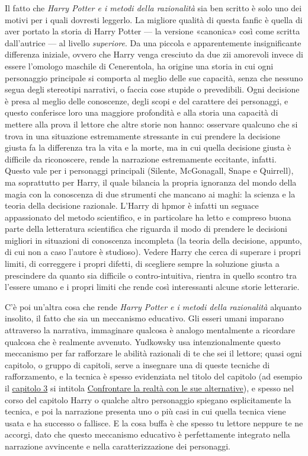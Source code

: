 Il fatto che \emph{Harry Potter e i metodi della razionalità} sia ben scritto è solo uno dei motivi per i quali dovresti leggerlo. La migliore qualità di questa fanfic è quella di aver portato la storia di Harry Potter — la versione «canonica» così come scritta dall’autrice — al livello \emph{superiore}. Da una piccola e apparentemente insignificante differenza iniziale, ovvero che Harry venga cresciuto da due zii amorevoli invece di essere l’omologo maschile di Cenerentola, ha origine una storia in cui ogni personaggio principale si comporta al meglio delle sue capacità, senza che nessuno segua degli stereotipi narrativi, o faccia cose stupide o prevedibili. Ogni decisione è presa al meglio delle conoscenze, degli scopi e del carattere dei personaggi, e questo conferisce loro una maggiore profondità e alla storia una capacità di mettere alla prova il lettore che altre storie non hanno: osservare qualcuno che si trova in una situazione estremamente stressante in cui prendere la decisione giusta fa la differenza tra la vita e la morte, ma in cui quella decisione giusta è difficile da riconoscere, rende la narrazione estremamente eccitante, infatti. Questo vale per i personaggi principali (Silente, McGonagall, Snape e Quirrell), ma soprattutto per Harry, il quale bilancia la propria ignoranza del mondo della magia con la conoscenza di due strumenti che mancano ai maghi: la scienza e la teoria della decisione razionale. L’Harry di hpmor è infatti un seguace appassionato del metodo scientifico, e in particolare ha letto e compreso buona parte della letteratura scientifica che riguarda il modo di prendere le decisioni migliori in situazioni di conoscenza incompleta (la teoria della decisione, appunto, di cui non a caso l’autore è studioso). Vedere Harry che cerca di superare i propri limiti, di correggere i propri difetti, di scegliere sempre la soluzione giusta a prescindere da quanto sia difficile o contro-intuitiva, rientra in quello scontro tra l’essere umano e i propri limiti che rende così interessanti alcune storie letterarie.

C’è poi un’altra cosa che rende \emph{Harry Potter e i metodi della razionalità} alquanto insolito, il fatto che sia un meccanismo educativo. Gli esseri umani imparano attraverso la narrativa, immaginare qualcosa è analogo mentalmente a ricordare qualcosa che è realmente avvenuto. Yudkowsky usa intenzionalmente questo meccanismo per far rafforzare le abilità razionali di te che sei il lettore; quasi ogni capitolo, o gruppo di capitoli, serve a insegnare una di queste tecniche di rafforzamento, e la tecnica è spesso evidenziata nel titolo del capitolo (ad esempio il \hyperref[capitolo 3]{capitolo 3} si intitola \hyperref[capitolo:3]{Confrontare la realtà con le sue alternative}), e spesso nel corso del capitolo Harry o qualche altro personaggio spiegano esplicitamente la tecnica, e poi la narrazione presenta uno o più casi in cui quella tecnica viene usata e ha successo o fallisce. E la cosa buffa è che spesso tu lettore neppure te ne accorgi, dato che questo meccanismo educativo è perfettamente integrato nella narrazione avvincente e nella caratterizzazione dei personaggi.

